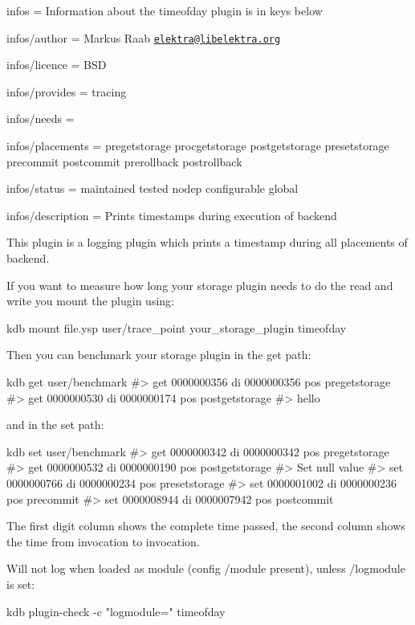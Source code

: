 
\begin{DoxyItemize}
\item infos = Information about the timeofday plugin is in keys below
\item infos/author = Markus Raab \href{mailto:elektra@libelektra.org}{\tt elektra@libelektra.\+org}
\item infos/licence = B\+SD
\item infos/provides = tracing
\item infos/needs =
\item infos/placements = pregetstorage procgetstorage postgetstorage presetstorage precommit postcommit prerollback postrollback
\item infos/status = maintained tested nodep configurable global
\item infos/description = Prints timestamps during execution of backend
\end{DoxyItemize}

This plugin is a logging plugin which prints a timestamp during all placements of backend.

If you want to measure how long your storage plugin needs to do the read and write you mount the plugin using\+:


\begin{DoxyCode}
kdb mount file.ysp user/trace\_point your\_storage\_plugin timeofday
\end{DoxyCode}


Then you can benchmark your storage plugin in the get path\+:


\begin{DoxyCode}
kdb get user/benchmark
#> get     0000000356      di      0000000356      pos     pregetstorage
#> get     0000000530      di      0000000174      pos     postgetstorage
#> hello
\end{DoxyCode}


and in the set path\+:


\begin{DoxyCode}
kdb set user/benchmark
#> get     0000000342      di      0000000342      pos     pregetstorage
#> get     0000000532      di      0000000190      pos     postgetstorage
#> Set null value
#> set     0000000766      di      0000000234      pos     presetstorage
#> set     0000001002      di      0000000236      pos     precommit
#> set     0000008944      di      0000007942      pos     postcommit
\end{DoxyCode}


The first digit column shows the complete time passed, the second column shows the time from invocation to invocation.

Will not log when loaded as module (config {\ttfamily /module} present), unless {\ttfamily /logmodule} is set\+:


\begin{DoxyCode}
kdb plugin-check -c "logmodule=" timeofday
\end{DoxyCode}
 